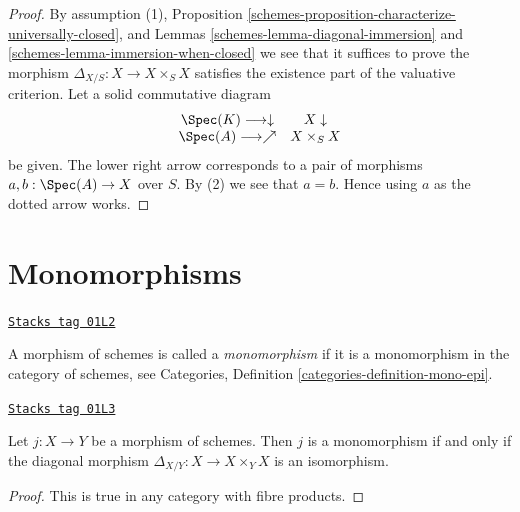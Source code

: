\begin{proof}

By assumption (1),
Proposition \ref{schemes-proposition-characterize-universally-closed}, and
Lemmas \ref{schemes-lemma-diagonal-immersion} and \ref{schemes-lemma-immersion-when-closed}
we see that it suffices to prove the morphism
$\Delta_{X/S} : X \to X \times_S X$ satisfies the existence
part of the valuative criterion.
Let a solid commutative diagram
$$
\begin{array}{cc}\Spec(K) \longrightarrow\downarrow & X \downarrow \\ \Spec(A) \longrightarrow\nearrow & X \times_S X\end{array}
$$
be given. The lower right arrow corresponds to a
pair of morphisms $a, b : \Spec(A) \to X$ over $S$.
By (2) we see that $a = b$. Hence using $a$ as the dotted
arrow works.
\end{proof}

\section{Monomorphisms}
\label{schemes-section-monomorphisms}
\begin{definition}[Monomorphism]
\label{schemes-definition-monomorphism}
\href{https://stacks.math.columbia.edu/tag/01L2}{\texttt{Stacks tag 01L2}}

A morphism of schemes is called a {\it monomorphism} if it is
a monomorphism in the category of schemes, see
Categories, Definition \ref{categories-definition-mono-epi}.
\end{definition}

\begin{lemma}
\label{schemes-lemma-monomorphism}
\href{https://stacks.math.columbia.edu/tag/01L3}{\texttt{Stacks tag 01L3}}


Let $j : X \to Y$ be a morphism of schemes.
Then $j$ is a monomorphism if and only if the
diagonal morphism $\Delta_{X/Y} : X \to X \times_Y X$ is
an isomorphism.
\end{lemma}

\begin{proof}
This is true in any category with fibre products.
\end{proof}

